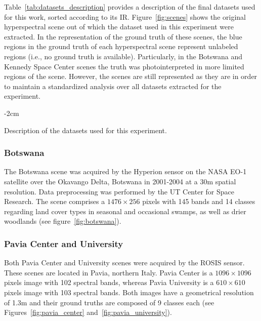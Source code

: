 \documentclass[authoryear,preprint,12pt]{elsarticle}
\begin{document}
\begin{linenumbers}
Table~\ref{tab:datasets_description} provides a description of the final
datasets used for this work, sorted according to its IR.
Figure~\ref{fig:scenes} shows the original hyperspectral scene out of which
the dataset used in this experiment were extracted. In the representation of
the ground truth of these scenes, the blue regions in the ground truth of each
hyperspectral scene represent unlabeled regions (i.e., no  ground truth is
available). Particularly, in the Botswana and Kennedy Space Center scenes the
truth was photointerpreted in more limited regions of the scene. However, the
scenes are still represented as they are in order to maintain a standardized
analysis over all datasets extracted for the experiment.

\begin{table}
	\centering
    \addtolength{\leftskip} {-2cm}
    \addtolength{\rightskip}{-2cm}
    \captionsetup{justification=centering}
    \caption{Description of the datasets used for this
    experiment.\label{tab:datasets_description}}
\end{table}

\subsubsection*{Botswana}

The Botswana scene was acquired by the Hyperion sensor on the NASA EO-1
satellite over the Okavango Delta, Botswana in 2001-2004 at a 30m spatial
resolution. Data preprocessing was performed by the UT Center for Space
Research. The scene comprises a $1476 \times 256$ pixels with 145 bands and 14
classes regarding land cover types in seasonal and occasional swamps, as well
as drier woodlands (see figure~\ref{fig:botswana}).

\subsubsection*{Pavia Center and University}

Both Pavia Center and University scenes were acquired by the ROSIS sensor.
These scenes are located in Pavia, northern Italy. Pavia Center is a $1096
\times 1096$ pixels image with 102 spectral bands, whereas Pavia University is
a $610 \times 610$ pixels image with 103 spectral bands. Both images have a
geometrical resolution of 1.3m and their ground truths are
composed of 9 classes each (see Figures~\ref{fig:pavia_center}
and~\ref{fig:pavia_university}).


\end{linenumbers}
\end{document}

